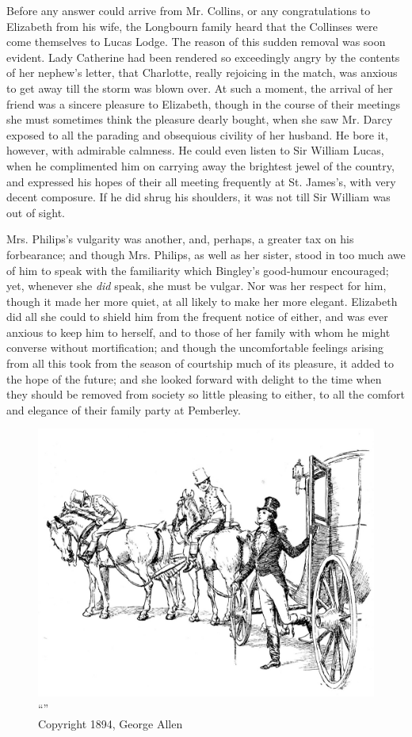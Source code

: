 Before any answer could arrive from Mr. Collins, or any congratulations to Elizabeth from his wife, the Longbourn family heard that the Collinses were come themselves to Lucas Lodge. The reason of this sudden removal was soon evident. Lady Catherine had been rendered so exceedingly angry by the contents of her nephew's letter, that Charlotte, really rejoicing in the match, was anxious to get away till the storm was blown over. At such a moment, the arrival of her friend was a sincere pleasure to Elizabeth, though in the course of their meetings she must sometimes think the pleasure dearly bought, when she saw Mr. Darcy exposed to all the parading and obsequious civility of her husband. He bore it, however, with admirable calmness. He could even listen to Sir William Lucas, when he complimented him on carrying away the brightest jewel of the country, and expressed his hopes of their all meeting frequently at St. James's, with very decent composure. If he did shrug his shoulders, it was not till Sir William was out of sight.

Mrs. Philips's vulgarity was another, and, perhaps, a greater tax on his forbearance; and though Mrs. Philips, as well as her sister, stood in too much awe of him to speak with the familiarity which Bingley's good-humour encouraged; yet, whenever she \textit{did} speak, she must be vulgar. Nor was her respect for him, though it made her more quiet, at all likely to make her more elegant. Elizabeth did all she could to shield him from the frequent notice of either, and was ever anxious to keep him to herself, and to those of her family with whom he might converse without mortification; and though the uncomfortable feelings arising from all this took from the season of courtship much of its pleasure, it added to the hope of the future; and she looked forward with delight to the time when they should be removed from society so little pleasing to either, to all the comfort and elegance of their family party at Pemberley.

\begin{figure}[htbp]
    \centering
    \includegraphics[width=\textwidth]{illustrations/i_031.jpg}
    \caption{“”\\ Copyright 1894, George Allen}
    \label{fig:image}
\end{figure}


